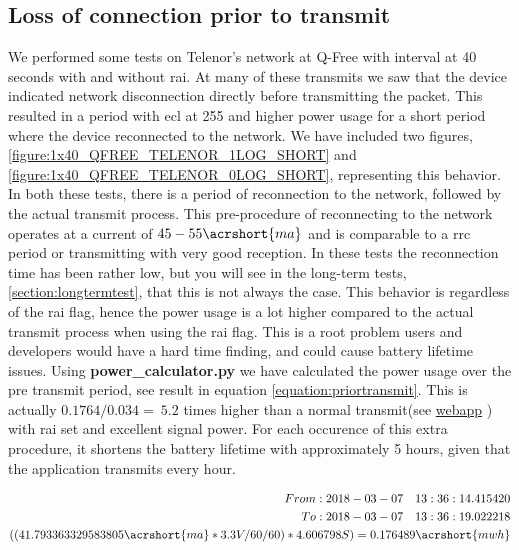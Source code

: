 \documentclass[USenglish]{ifimaster}  %
\begin{document}
\subsection{Loss of connection prior to transmit} \label{ssection:ecl_255}
We performed some tests on Telenor's network at Q-Free with interval at 40 seconds with and without \acrshort{rai}. At many of these transmits we saw that the device indicated network disconnection directly before transmitting the packet. This resulted in a period with \acrshort{ecl} at 255 and higher power usage for a short period where the device reconnected to the network. We have included two figures, \vref{figure:1x40_QFREE_TELENOR_1LOG_SHORT} and \vref{figure:1x40_QFREE_TELENOR_0LOG_SHORT}, representing this behavior. In both these tests, there is a period of reconnection to the network, followed by the actual transmit process. This pre-procedure of reconnecting to the network operates at a current of ${45-55 \acrshort{ma}}$ and is comparable to a \acrshort{rrc} period or transmitting with very good reception.
In these tests the reconnection time has been rather low, but you will see in the long-term tests, \vref{section:longtermtest}, that this is not always the case. This behavior is regardless of the \acrshort{rai} flag, hence the power usage is a lot higher compared to the actual transmit process when using the \acrshort{rai} flag. This is a root problem users and developers would have a hard time finding, and could cause battery lifetime issues. Using \textbf{power\_calculator.py} we have calculated the power usage over the pre transmit period, see result in equation \vref{equation:priortransmit}. This is actually ${0.1764 / 0.034 = ~5.2}$ times higher than a normal transmit(see \href{http://158.39.77.97:9000/\#/results/Q-Free_TELENOR_SHORT_TEST_2018-02-28_0_0x2_5_1_100}{webapp} \cite{online:result11}) with \acrshort{rai} set and excellent signal power. For each occurence of this extra procedure, it shortens the battery lifetime with approximately 5 hours, given that the application transmits every hour.

\begin{equation} \label{equation:priortransmit}
\begin{aligned}
From: 2018-03-07\quad 13:36:14.415420 \\
To: 2018-03-07\quad 13:36:19.022218 \\
((41.793363329583805\acrshort{ma} * 3.3V / 60 / 60 ) * 4.606798S) = 0.176489\acrshort{mwh} \\
\end{aligned}
\end{equation}
\end{document}

